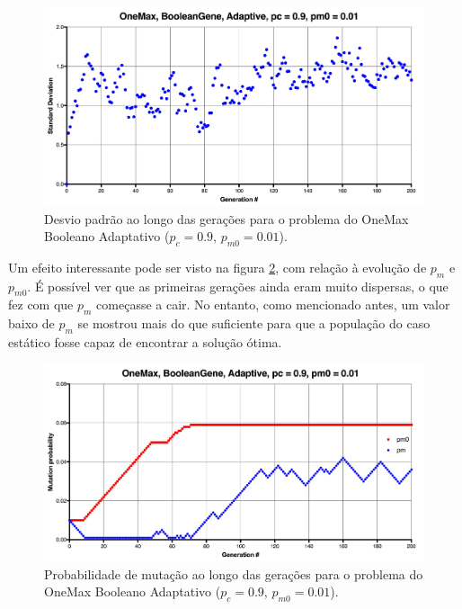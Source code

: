 \begin{figure}[ht!]
    \centering \includegraphics[width=1.0\textwidth]{onemax_boolean_adaptive_std.jpg}
    \caption{Desvio padrão ao longo das gerações para o problema do OneMax Booleano Adaptativo ($p_c=0.9$, $p_{m0}=0.01$).}
    \label{fig:onemax_boolean_adaptive_std}
\end{figure}

Um efeito interessante pode ser visto na figura \ref{fig:onemax_boolean_adaptive_pm}, com relação à evolução de $p_m$ e $p_{m0}$. É possível ver que as primeiras gerações ainda eram muito dispersas, o que fez com que $p_m$ começasse a cair. No entanto, como mencionado antes, um valor baixo de $p_m$ se mostrou mais do que suficiente para que a população do caso estático fosse capaz de encontrar a solução ótima.

\begin{figure}[ht!]
    \centering \includegraphics[width=1.0\textwidth]{onemax_boolean_adaptive_pm.jpg}
    \caption{Probabilidade de mutação ao longo das gerações para o problema do OneMax Booleano Adaptativo ($p_c=0.9$, $p_{m0}=0.01$).}
    \label{fig:onemax_boolean_adaptive_pm}
\end{figure}

